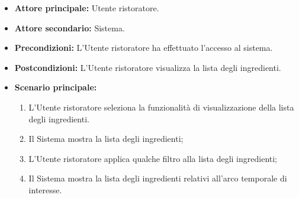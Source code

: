\label{usecase:Consulta lista degli ingredienti}
\begin{itemize}
	\item \textbf{Attore principale:} Utente ristoratore.

	\item \textbf{Attore secondario:} Sistema.

	\item \textbf{Precondizioni:}
	      L'Utente ristoratore ha effettuato l'accesso al sistema.

	\item \textbf{Postcondizioni:}
	      L'Utente ristoratore visualizza la lista degli ingredienti.

	\item \textbf{Scenario principale:}
	      \begin{enumerate}
		      \item L'Utente ristoratore seleziona la funzionalità di
		            visualizzazione della lista degli ingredienti.

		      \item Il Sistema mostra la lista degli ingredienti;

		      \item L'Utente ristoratore applica qualche filtro alla lista
		            degli ingredienti;

		      \item Il Sistema mostra la lista degli ingredienti
		            relativi all'arco temporale di interesse.
	      \end{enumerate}
\end{itemize}
